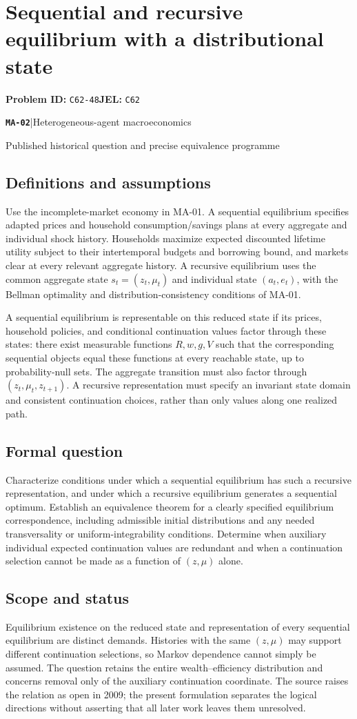 \documentclass[11pt,a4paper]{article}
\newcommand{\entrymeta}[3]{{\sffamily\small\color{muted}\textbf{\texttt{#1}}\quad|\quad #2\par #3\par}}
\begin{document}
\section*{Sequential and recursive equilibrium with a distributional state}
\textbf{Problem ID:} \texttt{C62-48}\quad \textbf{JEL:} \texttt{C62}\par
\label{problem:OP-0583}
\label{beyond:MA-02}
\entrymeta{MA-02}{Heterogeneous-agent macroeconomics}{Published historical question and precise equivalence programme}
\subsection*{Definitions and assumptions}
Use the incomplete-market economy in MA-01. A sequential equilibrium specifies adapted prices and household consumption/savings plans at every aggregate and individual shock history. Households maximize expected discounted lifetime utility subject to their intertemporal budgets and borrowing bound, and markets clear at every relevant aggregate history. A recursive equilibrium uses the common aggregate state $s_t=(z_t,\mu_t)$ and individual state $(a_t,e_t)$, with the Bellman optimality and distribution-consistency conditions of MA-01.

A sequential equilibrium is representable on this reduced state if its prices, household policies, and conditional continuation values factor through these states: there exist measurable functions $R,w,g,V$ such that the corresponding sequential objects equal these functions at every reachable state, up to probability-null sets. The aggregate transition must also factor through $(z_t,\mu_t,z_{t+1})$. A recursive representation must specify an invariant state domain and consistent continuation choices, rather than only values along one realized path.
\subsection*{Formal question}
Characterize conditions under which a sequential equilibrium has such a recursive representation, and under which a recursive equilibrium generates a sequential optimum. Establish an equivalence theorem for a clearly specified equilibrium correspondence, including admissible initial distributions and any needed transversality or uniform-integrability conditions. Determine when auxiliary individual expected continuation values are redundant and when a continuation selection cannot be made as a function of $(z,\mu)$ alone.
\subsection*{Scope and status}
Equilibrium existence on the reduced state and representation of every sequential equilibrium are distinct demands. Histories with the same $(z,\mu)$ may support different continuation selections, so Markov dependence cannot simply be assumed. The question retains the entire wealth--efficiency distribution and concerns removal only of the auxiliary continuation coordinate. The source raises the relation as open in 2009; the present formulation separates the logical directions without asserting that all later work leaves them unresolved.
\end{document}
